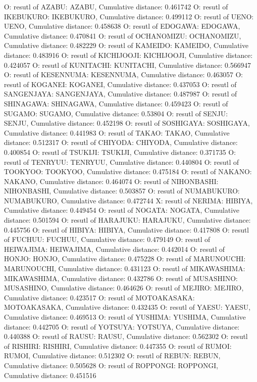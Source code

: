 O: resutl of AZABU: AZABU, Cumulative distance: 0.461742
O: resutl of IKEBUKURO: IKEBUKURO, Cumulative distance: 0.499112
O: resutl of UENO: UENO, Cumulative distance: 0.458638
O: resutl of EDOGAWA: EDOGAWA, Cumulative distance: 0.470841
O: resutl of OCHANOMIZU: OCHANOMIZU, Cumulative distance: 0.482229
O: resutl of KAMEIDO: KAMEIDO, Cumulative distance: 0.483916
O: resutl of KICHIJOOJI: KICHIJOOJI, Cumulative distance: 0.424057
O: resutl of KUNITACHI: KUNITACHI, Cumulative distance: 0.566947
O: resutl of KESENNUMA: KESENNUMA, Cumulative distance: 0.463057
O: resutl of KOGANEI: KOGANEI, Cumulative distance: 0.437053
O: resutl of SANGENJAYA: SANGENJAYA, Cumulative distance: 0.487987
O: resutl of SHINAGAWA: SHINAGAWA, Cumulative distance: 0.459423
O: resutl of SUGAMO: SUGAMO, Cumulative distance: 0.53804
O: resutl of SENJU: SENJU, Cumulative distance: 0.452198
O: resutl of SOSHIGAYA: SOSHIGAYA, Cumulative distance: 0.441983
O: resutl of TAKAO: TAKAO, Cumulative distance: 0.512317
O: resutl of CHIYODA: CHIYODA, Cumulative distance: 0.400854
O: resutl of TSUKIJI: TSUKIJI, Cumulative distance: 0.371735
O: resutl of TENRYUU: TENRYUU, Cumulative distance: 0.440804
O: resutl of TOOKYOO: TOOKYOO, Cumulative distance: 0.475184
O: resutl of NAKANO: NAKANO, Cumulative distance: 0.464074
O: resutl of NIHONBASHI: NIHONBASHI, Cumulative distance: 0.503857
O: resutl of NUMABUKURO: NUMABUKURO, Cumulative distance: 0.472744
X: resutl of NERIMA: HIBIYA, Cumulative distance: 0.449454
O: resutl of NOGATA: NOGATA, Cumulative distance: 0.501594
O: resutl of HARAJUKU: HARAJUKU, Cumulative distance: 0.445756
O: resutl of HIBIYA: HIBIYA, Cumulative distance: 0.417808
O: resutl of FUCHUU: FUCHUU, Cumulative distance: 0.479149
O: resutl of HEIWAJIMA: HEIWAJIMA, Cumulative distance: 0.442014
O: resutl of HONJO: HONJO, Cumulative distance: 0.475228
O: resutl of MARUNOUCHI: MARUNOUCHI, Cumulative distance: 0.431123
O: resutl of MIKAWASHIMA: MIKAWASHIMA, Cumulative distance: 0.432786
O: resutl of MUSASHINO: MUSASHINO, Cumulative distance: 0.464626
O: resutl of MEJIRO: MEJIRO, Cumulative distance: 0.423517
O: resutl of MOTOAKASAKA: MOTOAKASAKA, Cumulative distance: 0.432435
O: resutl of YAESU: YAESU, Cumulative distance: 0.469513
O: resutl of YUSHIMA: YUSHIMA, Cumulative distance: 0.442705
O: resutl of YOTSUYA: YOTSUYA, Cumulative distance: 0.440388
O: resutl of RAUSU: RAUSU, Cumulative distance: 0.562302
O: resutl of RISHIRI: RISHIRI, Cumulative distance: 0.447355
O: resutl of RUMOI: RUMOI, Cumulative distance: 0.512302
O: resutl of REBUN: REBUN, Cumulative distance: 0.505628
O: resutl of ROPPONGI: ROPPONGI, Cumulative distance: 0.451516
